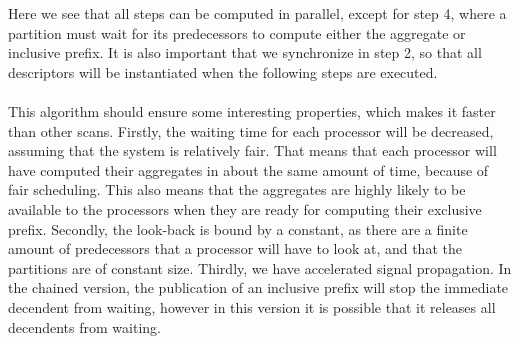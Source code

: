 Here we see that all steps can be computed in parallel, except for step 4, where a partition must wait for its predecessors to compute either the aggregate or inclusive prefix.
It is also important that we synchronize in step 2, so that all descriptors will be instantiated when the following steps are executed.
\\~\\
This algorithm should ensure some interesting properties, which makes it faster than other scans.
Firstly, the waiting time for each processor will be decreased, assuming that the system is relatively fair.
That means that each processor will have computed their aggregates in about the same amount of time, because of fair scheduling.
This also means that the aggregates are highly likely to be available to the processors when they are ready for computing their exclusive prefix.
Secondly, the look-back is bound by a constant, as there are a finite amount of predecessors that a processor will have to look at, and that the partitions are of constant size.
Thirdly, we have accelerated signal propagation. In the chained version, the publication of an inclusive prefix will stop the immediate decendent from waiting, however in this version it is possible that it releases all decendents from waiting.
